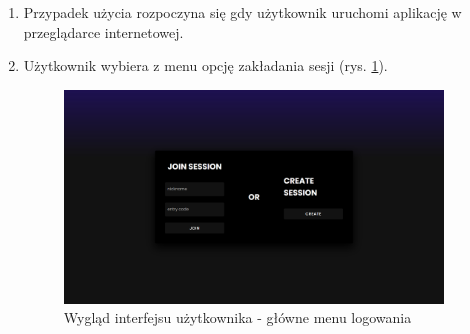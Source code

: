 \begin{enumerate}
\item Przypadek użycia rozpoczyna się gdy użytkownik uruchomi aplikację w przeglądarce internetowej.
\item Użytkownik wybiera z menu opcję zakładania sesji (rys. \ref{fig:auth-menu}).
\begin{figure}[h]
\centering
\includegraphics[width=0.95\textwidth]{./graf/auth_menu.png}
\caption{Wygląd interfejsu użytkownika - główne menu logowania}
\label{fig:auth-menu}
\end{figure}


\end{enumerate}
